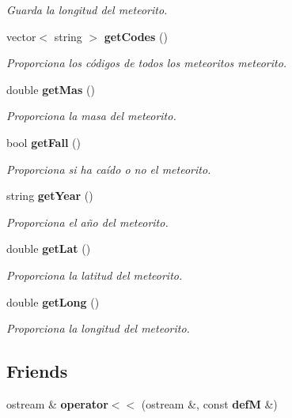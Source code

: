 \begin{DoxyCompactItemize}
\begin{DoxyCompactList}\small\item\em Guarda la longitud del meteorito. \end{DoxyCompactList}\item 
vector$<$ string $>$ {\bf get\+Codes} ()
\begin{DoxyCompactList}\small\item\em Proporciona los códigos de todos los meteoritos meteorito. \end{DoxyCompactList}\item 
double {\bf get\+Mas} ()
\begin{DoxyCompactList}\small\item\em Proporciona la masa del meteorito. \end{DoxyCompactList}\item 
bool {\bf get\+Fall} ()
\begin{DoxyCompactList}\small\item\em Proporciona si ha caído o no el meteorito. \end{DoxyCompactList}\item 
string {\bf get\+Year} ()
\begin{DoxyCompactList}\small\item\em Proporciona el año del meteorito. \end{DoxyCompactList}\item 
double {\bf get\+Lat} ()
\begin{DoxyCompactList}\small\item\em Proporciona la latitud del meteorito. \end{DoxyCompactList}\item 
double {\bf get\+Long} ()
\begin{DoxyCompactList}\small\item\em Proporciona la longitud del meteorito. \end{DoxyCompactList}\end{DoxyCompactItemize}
\subsection*{Friends}
\begin{DoxyCompactItemize}
\item 
ostream \& {\bfseries operator$<$$<$} (ostream \&, const {\bf def\+M} \&)\label{classdef_m_a3784f8dcda03b04a658b79b87c603945}

\end{DoxyCompactItemize}


